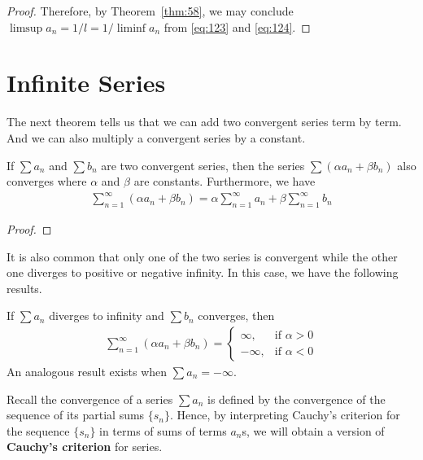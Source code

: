 \documentclass[thmcnt=section, 12pt]{my-elegantbook}
\begin{document}
\begin{proof}
    Therefore, by Theorem~\ref{thm:58}, we may conclude $\limsup a_n = 1 / l = 1 / \liminf a_n$ from \eqref{eq:123} and \eqref{eq:124}.
\end{proof}


\section{Infinite Series}


The next theorem tells us that we can add two convergent series term by term. And we can also multiply a convergent series by a constant.

\begin{theorem} \label{thm:48}
    If $\sum a_n$ and $\sum b_n$ are two convergent series, 
	then the series $\sum (\alpha a_n + \beta b_n)$ also converges 
	where $\alpha$ and $\beta$ are constants. 
	Furthermore, we have 
    \begin{align*}
        \sum_{n=1}^\infty (\alpha a_n + \beta b_n)
        = \alpha \sum_{n=1}^\infty a_n 
        + \beta \sum_{n=1}^\infty b_n
    \end{align*}
\end{theorem}

\begin{proof}
\end{proof}

It is also common that 
only one of the two series
is convergent while the other one diverges to 
positive or negative infinity.
In this case, we have the following results.

\begin{theorem} \label{thm:72}
	If $\sum a_n$ diverges to infinity
	and $\sum b_n$ converges,
	then 
	\begin{align*}
		\sum_{n=1}^\infty (\alpha a_n + \beta b_n)
		= \begin{cases}
			\infty,
			&\text{if $\alpha > 0$} \\ 
			-\infty,
			&\text{if $\alpha < 0$}
		\end{cases}
	\end{align*}
	An analogous result exists when $\sum a_n = -\infty$.
\end{theorem}


Recall the convergence of a series $\sum a_n$ is defined by the convergence of the sequence of its partial sums $\{s_n\}$. Hence, by interpreting Cauchy's criterion for the sequence $\{s_n\}$ in terms of sums of terms $a_n$s, we will obtain a version of \textbf{Cauchy's criterion} for series.
\end{document}
